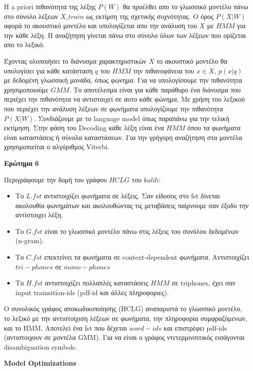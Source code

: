 \documentclass[12pt]{article}
\begin{document}
Η a priori πιθανότητα της λέξης $P(W)$ θα προέλθει απο το γλωσσικό μοντέλο πάνω στο σύνολο λέξεων $X\_train$ ως εκτίμση της σχετικής συχνότητας. Ο όρος $P(X|W)$ αφορά το ακουστικό μοντέλο και υπολογίζεται απο την ανάλυση του $X$ με $HMM$ για την κάθε λέξη.  Η αναζήτηση γίνεται πάνω στο σύνολο όλων των λέξεων που ορίζεται απο το λεξικό. 

Έχοντας υλοποιήσει το διάνυσμα χαρακτηριστικών $X$ το ακουστικό μοντέλο θα υπολογίσει για κάθε κατάσταση $q$ του $HMM$ την πιθανοφάνεια του $x \in X$,  $p(x|q)$ με δεδομένη γλωσσική μονάδα, όπως φώνημα. Για να υπολογίσουμε την πιθανότητα χρησιμοποιούμε $GMM$. Το αποτέλεσμα είναι για κάθε παράθυρο ένα διάνυσμα που περιέχει την πιθανότητα να αντιστοιχεί σε αυτο κάθε φώνημα. Με χρήση του λεξικού που περιέχει την ανάλυση λέξεων σε φωνήματα υπολογίζουμε την πιθανότητα $P(X|W)$. Συνδιάζουμε με το language model όπως παραπάνω για την τελική εκτίμηση. Στην φάση του Decoding κάθε λέξη είναι ένα $HMM$ όπου τα φωνήματα είναι καταστάσεις ή σύνολα καταστάσεων. Για την γρήγορη αναζήτηση στα μοντέλα χρησιμοπιείται ο αλγόριθμος Viterbi.



\textbf{Ερώτημα 6}

Περιγράφουμε την δομή του γράφου $HCLG$ του $kaldi$:
\begin{itemize}
    \item Το $L.fst$ αντιστοιχίζει φωνήματα σε λέξεις. Σαν είδοσος στο fst δίνεται ακολουθία φωνημάτων και ακολουθώντας τις μεταβάσεις παίρνουμε σαν έξοδο την αντίστοιχει λέξη. 
    \item Το $G.fst$ είναι το γλωσσικό μοντέλο πάνω στις λέξεις του συνόλου δεδομένων (n-gram).
    \item Το $C.fst$ επεκτείνει τα φωνήματα σε context-dependent φωνήματα. Αντιστοιχίζει $tri-phones$ σε $mono-phones$
    \item Το $Η.fst$ αντιστοιχίζει πολλαπλές καταστάσεις $HMM$ σε triphones, έχει σαν input trainsition-ids (pdf-id και άλλες πληροφοριες). 
\end{itemize}

Ο συνολικός γράφος αποκωδικοποίησης (HCLG) αναπαριστά το γλωσσικό μοντέλο, το λεξικό με την αντιστοίχιση λέξεων σε φωνήματα, την πληροφορία συμφραζόμενων, και το HMM. Αποτελεί ένα fst που δέχεται $word-ids$ και επιστρέφει pdf-ids (αντιστοιχουν σε μοντέλα GMM). Για να είναι ο γράφος ντετερμινσιτικός εισάγονται disambiguation symbols.

\textbf{Model Optimizations}
\end{document}
